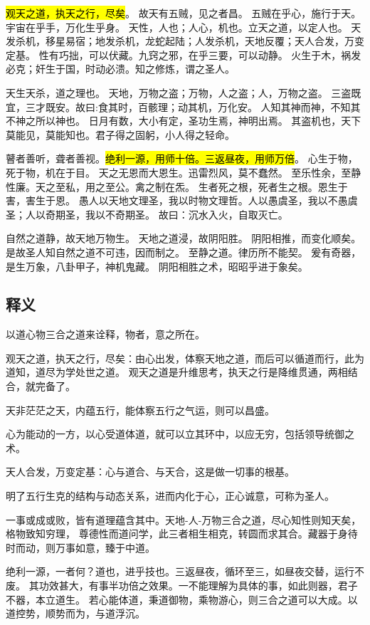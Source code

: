 \hl{观天之道，执天之行，尽矣}。
故天有五贼，见之者昌。
五贼在乎心，施行于天。宇宙在乎手，万化生乎身。
天性，人也；人心，机也。立天之道，以定人也。
天发杀机，移星易宿；地发杀机，龙蛇起陆；人发杀机，天地反覆；天人合发，万变定基。
性有巧拙，可以伏藏。九窍之邪，在乎三要，可以动静。
火生于木，祸发必克；奸生于国，时动必溃。知之修炼，谓之圣人。

天生天杀，道之理也。
天地，万物之盗；万物，人之盗；人，万物之盗。
三盗既宜，三才既安。故曰:食其时，百骸理；动其机，万化安。
人知其神而神，不知其不神之所以神也。
日月有数，大小有定，圣功生焉，神明出焉。
其盗机也，天下莫能见，莫能知也。君子得之固躬，小人得之轻命。 

瞽者善听，聋者善视。\hl{绝利一源，用师十倍。三返昼夜，用师万倍}。
心生于物，死于物，机在于目。
天之无恩而大恩生。迅雷烈风，莫不蠢然。
至乐性余，至静性廉。天之至私，用之至公。禽之制在炁。
生者死之根，死者生之根。恩生于害，害生于恩。
愚人以天地文理圣，我以时物文理哲。人以愚虞圣，我以不愚虞圣；人以奇期圣，我以不奇期圣。
故曰：沉水入火，自取灭亡。

自然之道静，故天地万物生。
天地之道浸，故阴阳胜。
阴阳相推，而变化顺矣。是故圣人知自然之道不可违，因而制之。
至静之道。律历所不能契。
爰有奇器，是生万象，八卦甲子，神机鬼藏。
阴阳相胜之术，昭昭乎进于象矣。 

\subsection{释义}

以道心物三合之道来诠释，物者，意之所在。

观天之道，执天之行，尽矣：由心出发，体察天地之道，而后可以循道而行，此为道知，道尽为学处世之道。
观天之道是升维思考，执天之行是降维贯通，两相结合，就完备了。

天非茫茫之天，内蕴五行，能体察五行之气运，则可以昌盛。

心为能动的一方，以心受道体道，就可以立其环中，以应无穷，包括领导统御之术。

天人合发，万变定基：心与道合、与天合，这是做一切事的根基。

明了五行生克的结构与动态关系，进而内化于心，正心诚意，可称为圣人。

一事或成或败，皆有道理蕴含其中。天地-人-万物三合之道，尽心知性则知天矣，格物致知穷理，
尊德性而道问学，此三者相生相克，转圆而求其合。藏器于身待时而动，则万事如意，臻于中道。

绝利一源，一者何？道也，进乎技也。三返昼夜，循环至三，如昼夜交替，运行不废。
其功效甚大，有事半功倍之效果。一不能理解为具体的事，如此则器，君子不器，本立道生。
若心能体道，秉道御物，乘物游心，则三合之道可以大成。以道控势，顺势而为，与道浮沉。

